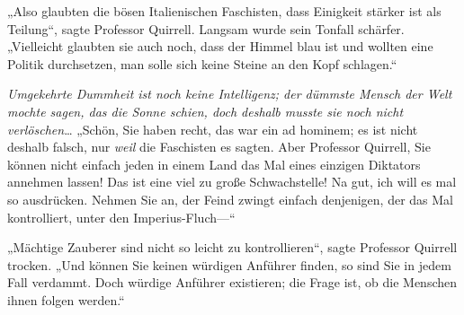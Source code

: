 „Also glaubten die bösen Italienischen Faschisten, dass Einigkeit stärker ist als Teilung“, sagte Professor Quirrell. Langsam wurde sein Tonfall schärfer.
„Vielleicht glaubten sie auch noch, dass der Himmel blau ist und wollten eine Politik durchsetzen, man solle sich keine Steine an den Kopf schlagen.“

\emph{Umgekehrte Dummheit ist noch keine Intelligenz; der dümmste Mensch der Welt mochte sagen, das die Sonne schien, doch deshalb musste sie noch nicht verlöschen}…%
„Schön, Sie haben recht, das war ein ad hominem; es ist nicht deshalb falsch, nur \emph{weil} die Faschisten es sagten. Aber Professor Quirrell, Sie können nicht einfach jeden in einem Land das Mal eines einzigen Diktators annehmen lassen! Das ist eine viel zu große Schwachstelle!%
Na gut, ich will es mal so ausdrücken. Nehmen Sie an, der Feind zwingt einfach denjenigen, der das Mal kontrolliert, unter den Imperius-Fluch—“

„Mächtige Zauberer sind nicht so leicht zu kontrollieren“, sagte Professor Quirrell trocken.
„Und können Sie keinen würdigen Anführer finden, so sind Sie in jedem Fall verdammt. Doch würdige Anführer existieren; die Frage ist, ob die Menschen ihnen folgen werden.“

